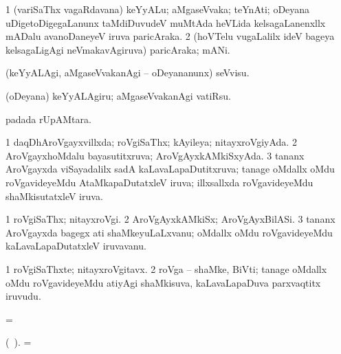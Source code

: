 \bentry
{} 
\gl{\nA}
\expl{}
\bmng
\bnum
\num{1} (variSaThx vagaRdavana) keYyALu; aMgaseVvaka; teYnAti; oDeyana uDigetoDigegaLanunx taMdiDuvudeV muMtAda heVLida kelsagaLanenxllx mADalu avanoDaneyeV iruva paricAraka. 
\num{2} (hoVTelu \mo vugaLalilx ideV bageya kelsagaLigAgi neVmakavAgiruva) paricAraka; mANi. 
\enum
\emng
\eentry

\bentry
{} 
\gl{\kirx}


\noindent
\gl{\sakirx}
\expl{}
\bmng
 (keYyALAgi, aMgaseVvakanAgi -- oDeyananunx) seVvisu. 
\emng

\noindent 
\gl{\akirx}
\expl{}
\bmng
 (oDeyana) keYyALAgiru; aMgaseVvakanAgi vatiRsu. 
\emng
\eentry

\bentry
{} 
\gl{\nA}
\expl{}
\bmng
  padada rUpAMtara. 
\emng
\eentry

\bentry
{} 
\gl{\gu}
\expl{}
\bmng
\bnum
\num{1} daqDhAroVgayxvillxda; roVgiSaThx; kAyileya; nitayxroVgiyAda. 
\num{2} AroVgayxhoMdalu bayasutitxruva; AroVgAyxkAMkiSxyAda. 
\num{3} tananx AroVgayxda viSayadalilx sadA kaLavaLapaDutitxruva; tanage oMdallx oMdu roVgavideyeMdu AtaMkapaDutatxleV iruva; illxsallxda roVgavideyeMdu shaMkisutatxleV iruva. 
\enum
\emng
\eentry

\bentry
{} 
\gl{\nA}
\expl{}
\bmng
\bnum
\num{1} roVgiSaThx; nitayxroVgi. 
\num{2} AroVgAyxkAMkiSx; AroVgAyxBilASi. 
\num{3} tananx AroVgayxda bagegx ati shaMkeyuLaLxvanu; oMdallx oMdu roVgavideyeMdu kaLavaLapaDutatxleV iruvavanu. 
\enum
\emng
\eentry

\bentry
{} 
\gl{\nA}
\expl{}
\bmng
\bnum
\num{1} roVgiSaThxte; nitayxroVgitavx. 
\num{2} roVga -- shaMke, BiVti; tanage oMdallx oMdu roVgavideyeMdu atiyAgi shaMkisuva, kaLavaLapaDuva parxvaqtitx iruvudu. 
\enum
\emng
\eentry

\bentry
{} 
\gl{\gu}
\expl{}
\bmng
=  
\emng
\eentry

\bentry
{} 
\gl{\nA}
\expl{}
(\bava\ ). \bmng
= 
\emng
\eentry

